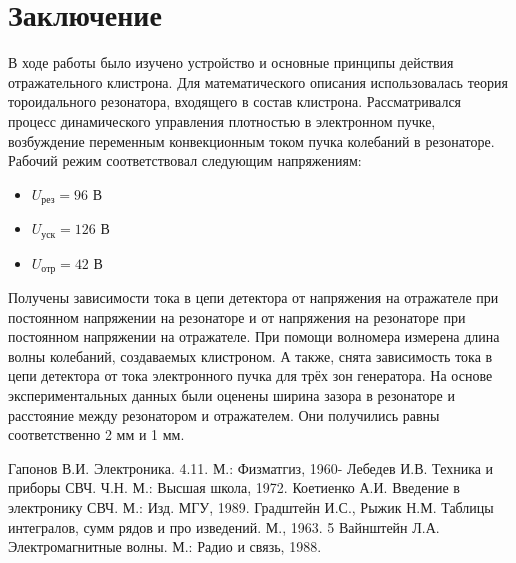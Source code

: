 
\section{Заключение}
В ходе работы было изучено устройство и основные принципы действия отражательного клистрона. Для математического описания использовалась теория тороидального резонатора, входящего в состав клистрона. Рассматривался процесс динамического управления плотностью в электронном пучке, возбуждение переменным конвекционным током пучка колебаний в резонаторе.  Рабочий режим соответствовал следующим напряжениям: 
\begin{itemize}
	\item $U_{\text{рез}}=96$ В
	\item $U_{\text{уск}}=126$ В
	\item $U_{\text{отр}}=42$ В
\end{itemize}

Получены зависимости тока в цепи детектора от напряжения на отражателе при постоянном напряжении на резонаторе и от напряжения на резонаторе при постоянном напряжении на отражателе. При помощи волномера измерена длина волны колебаний, создаваемых клистроном. А также, снята зависимость тока в цепи детектора от тока электронного пучка для трёх зон генератора. На основе экспериментальных данных были оценены ширина зазора в резонаторе и расстояние между резонатором и отражателем. Они получились равны соответственно 2 мм и 1 мм.


\begin{thebibliography}{}
	  Гапонов В.И. Электроника. 4.11. М.: Физматгиз, 1960-
	  Лебедев И.В. Техника и приборы СВЧ. Ч.Н. М.: Высшая школа, 1972.
	  Коетиенко А.И. Введение в электронику СВЧ. М.: Изд. МГУ, 1989.
	  Градштейн И.С., Рыжик Н.М. Таблицы интегралов, сумм рядов и про­
	изведений. М., 1963. 5
	  Вайнштейн Л.А. Электромагнитные волны. М.: Радио и связь, 1988.
\end{thebibliography}
